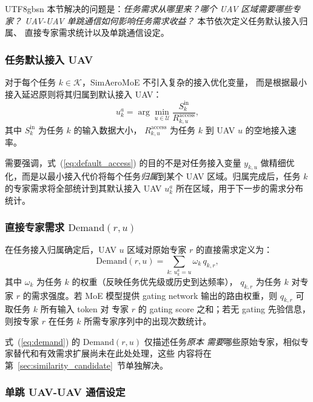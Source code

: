 \documentclass[conference]{IEEEtran}
\begin{document}
\begin{CJK*}{UTF8}{gbsn}
本节解决的问题是：\emph{任务需求从哪里来？哪个 UAV 区域需要哪些专家？
UAV-UAV 单跳通信如何影响任务需求收益？} 本节依次定义任务默认接入归属、
直接专家需求统计以及单跳通信设定。

\subsubsection{任务默认接入 UAV}

对于每个任务 $k\in\mathcal{K}$，SimAeroMoE 不引入复杂的接入优化变量，
而是根据最小接入延迟原则将其归属到默认接入 UAV：
\begin{equation}
u_k^a = \arg\min_{u\in\mathcal{U}} \frac{S_k^{\mathrm{in}}}{R_{k,u}^{\mathrm{access}}},
\label{eq:default_access}
\end{equation}
其中 $S_k^{\mathrm{in}}$ 为任务 $k$ 的输入数据大小，
$R_{k,u}^{\mathrm{access}}$ 为任务 $k$ 到 UAV $u$ 的空地接入速率。

需要强调，式~(\ref{eq:default_access}) 的目的不是对任务接入变量
$y_{k,u}$ 做精细优化，而是以最小接入代价将每个任务\emph{归属}到某个
UAV 区域。归属完成后，任务 $k$ 的专家需求将全部统计到其默认接入 UAV
$u_k^a$ 所在区域，用于下一步的需求分布统计。

\subsubsection{直接专家需求 \texorpdfstring{$\mathrm{Demand}(r,u)$}{Demand(r,u)}}

在任务接入归属确定后，UAV $u$ 区域对原始专家 $r$ 的直接需求定义为：
\begin{equation}
\mathrm{Demand}(r,u) = \sum_{k:\,u_k^a = u} \omega_k \, q_{k,r},
\label{eq:demand}
\end{equation}
其中 $\omega_k$ 为任务 $k$ 的权重（反映任务优先级或历史到达频率），
$q_{k,r}$ 为任务 $k$ 对专家 $r$ 的需求强度。若 MoE 模型提供 gating
network 输出的路由权重，则 $q_{k,r}$ 可取任务 $k$ 所有输入 token 对
专家 $r$ 的 gating score 之和；若无 gating 先验信息，则按专家 $r$
在任务 $k$ 所需专家序列中的出现次数统计。

式~(\ref{eq:demand}) 的 $\mathrm{Demand}(r,u)$ 仅描述任务\emph{原本
需要}哪些原始专家，相似专家替代和有效需求扩展尚未在此处处理，这些
内容将在第~\ref{sec:similarity_candidate}~节单独解决。

\subsubsection{单跳 UAV-UAV 通信设定}


\end{CJK*}
\end{document}
